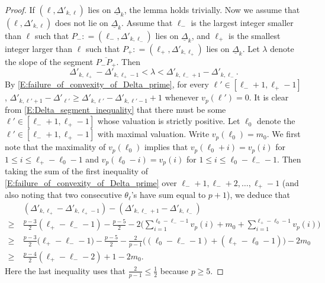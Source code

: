 \begin{proof}
    If $(\ell, \Delta'_{k,\ell})$ lies on $\underline \Delta_k$, the lemma holds trivially. Now we assume that $(\ell,\Delta'_{k,\ell})$ does not lie on $\underline \Delta_k$. Assume that $\ell_-$ is the largest integer smaller than $\ell$ such that $P_-: =(\ell_-, \Delta'_{k,\ell_-})$ lies on $\underline \Delta_k$, and  $\ell_+$ is the smallest integer larger than $\ell$ such that $P_+: =(\ell_+, \Delta'_{k,\ell_+})$ lies on $\underline \Delta_k$.  Let $\lambda$ denote the slope of the segment $\overline{P_-P_+}$. Then
    \begin{equation}
    \label{E:Delta_segment_inequality}
    \Delta'_{k, \ell_+}-\Delta'_{k, \ell_+-1}<  \lambda< \Delta'_{k, \ell_-+1}-\Delta'_{k, \ell_-} .
    \end{equation}
    By \eqref{E:failure_of_convexity_of_Delta_prime}, for every $\ell' \in [\ell_-+1, \ell_+-1]$, $ \Delta'_{k, \ell'+1} -  \Delta'_{\ell'} \geq  \Delta'_{k, \ell'}- \Delta'_{k, \ell'-1} + 1$ whenever $v_p(\ell')=0$. It is clear from \eqref{E:Delta_segment_inequality} that there must be some $\ell' \in [\ell_-+1, \ell_+-1]$ whose valuation is strictly positive. Let $\ell_0$ denote the $\ell' \in [\ell_-+1, \ell_+-1]$ with maximal valuation. Write $v_p(\ell_0)=m_0$.
    We first note that the maximality of $v_p(\ell_0)$ implies that $v_p(\ell_0+i)=v_p(i)$ for $1\leq i\leq \ell_+-\ell_0-1$ and $v_p(\ell_0-i)=v_p(i)$ for $1\leq i\leq \ell_0-\ell_--1$. Then taking the sum of the first inequality of \eqref{E:failure_of_convexity_of_Delta_prime} over $\ell_-+1,\ell_-+2, \dots, \ell_+-1$ (and also noting that two consecutive $\theta_{\ell}$'s have sum equal to $p+1$), we deduce that
    \begin{align*}
    &(\Delta'_{k, \ell_+}-\Delta'_{k, \ell_+-1})  -  (\Delta'_{k, \ell_-+1}-\Delta'_{k, \ell_-})
    \\
    \geq \ & \frac{p-3}2( \ell_+-\ell_--1) - \frac{p-5}2 -2\Big( \sum_{i=1}^{\ell_0-\ell_--1}v_p(i) + m_0 + \sum_{i=1}^{\ell_+-\ell_0-1}v_p(i)\Big)
    \\
    \geq \ & \frac{p-3}2\big( \ell_+-\ell_--1\big) - \frac{p-5}2 -\frac{2}{p-1}\big((\ell_0-\ell_--1) + (\ell_+-\ell_0-1)\big) -2m_0
    \\
    \geq\ & \frac{p-4}{2}(\ell_+-\ell_--2)+1-2m_0.
    \end{align*}
    Here the last inequality uses that $\frac{2}{p-1}\leq \frac 12$ because $p \geq 5$.

\end{proof}
